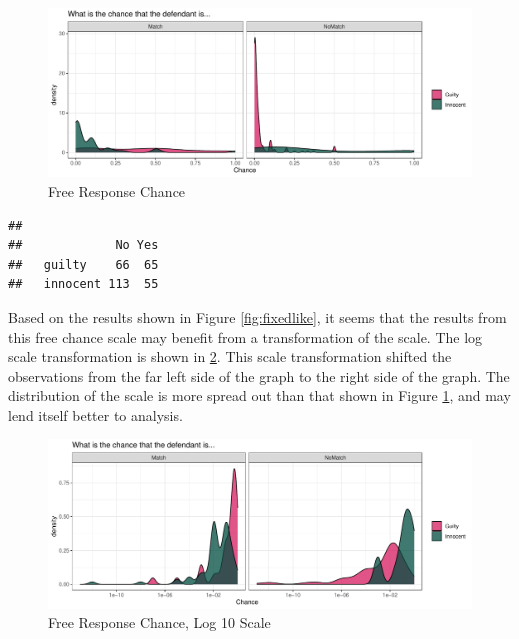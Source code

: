 \documentclass[print]{nuthesis}
\newenvironment{Shaded}{\begin{snugshade}}{\end{snugshade}}
\newcommand{\FunctionTok}[1]{\textcolor[rgb]{0.13,0.29,0.53}{\textbf{#1}}}
\newcommand{\NormalTok}[1]{#1}
\newcommand{\SpecialCharTok}[1]{\textcolor[rgb]{0.81,0.36,0.00}{\textbf{#1}}}
\begin{document}
\begin{figure}

{\centering \includegraphics[width=\linewidth]{thesis_files/figure-latex/freelike-1} 

}

\caption{Free Response Chance}\label{fig:freelike}
\end{figure}

\begin{Shaded}
\end{Shaded}

\begin{verbatim}
##           
##             No Yes
##   guilty    66  65
##   innocent 113  55
\end{verbatim}

Based on the results shown in Figure \ref{fig:fixedlike}, it seems that the results from this free chance scale may benefit from a transformation of the scale.
The log scale transformation is shown in \ref{fig:freelike10}.
This scale transformation shifted the observations from the far left side of the graph to the right side of the graph.
The distribution of the scale is more spread out than that shown in Figure \ref{fig:freelike}, and may lend itself better to analysis.

\begin{figure}

{\centering \includegraphics[width=\linewidth]{thesis_files/figure-latex/freelike10-1} 

}

\caption{Free Response Chance, Log 10 Scale}\label{fig:freelike10}
\end{figure}
\end{document}
